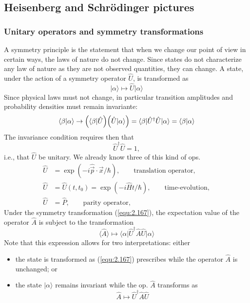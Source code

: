 \subsection{Heisenberg and Schrödinger pictures}
\subsubsection{Unitary operators and symmetry
transformations}
A symmetry principle is the statement that when we change
our point of view in certain ways, the laws of nature do not
change. Since states do not characterize any law of nature
as they are not observed quantities, they can change.
A state, under the action of a symmetry operator $\hat{U}$,
is transformed as
\begin{equation}
  \vert \alpha \rangle \mapsto \hat{U}\vert \alpha \rangle
  \label{equ:2.167}
\end{equation}
Since physical laws must not change, in particular
transition amplitudes and probability densities must remain
invariante:
\begin{equation}
  \langle \beta \vert \alpha \rangle \to  \Bigl(\langle
  \beta\vert \hat{U}\Bigr)
  \Bigl(
  \hat{U}\vert \alpha \rangle
  \Bigr)
  = \langle \beta \vert \hat{U}^{\dagger} \hat{U} \vert
  \alpha \rangle = \langle \beta \vert \alpha \rangle
  \label{equ:2.168}
\end{equation}
The invariance condition requires then that
\begin{equation}
  \hat{U}^{\dagger}\hat{U} = 1,
  \label{equ:2.169}
\end{equation}
i.e., that $\hat{U}$ be unitary. We already know three of
this kind of ops.
\begin{subequations}
  \begin{alignat}{2}
    \hat{U} &= \exp(-i\hat{\vec{p}}\cdot \vec{x}/\hbar),
    \qquad \text{translation operator,} \label{equ:2.170a}\\
    \hat{U} &= \hat{U}(t,t_0) = \exp(-i \hat{H}t /\hbar),
    \qquad \text{time-evolution},\label{equ:2.170b}\\
    \hat{U} &= \hat{P}, \qquad \text{parity operator},
    \label{equ:2.170c}
  \end{alignat}
\end{subequations}
Under the symmetry transformation (\ref{equ:2.167}), the
expectation value of the operator $\hat{A}$ is subject to
the transformation
\begin{equation}
  \langle \hat{A} \rangle \mapsto \langle \alpha \vert
  \hat{U}^{\dagger} \hat{A} \hat{U} \vert \alpha \rangle
  \label{equ:2.171}
\end{equation}
Note that this expression allows for two interpretations:
either
\begin{itemize}
  \item the state is transformed as (\ref{equ:2.167})
    prescribes while the operator $\hat{A}$ is unchanged; or
  \item the state $\vert \alpha \rangle$ remains invariant
    while the op. $\hat{A}$ transforms as
    \begin{equation}
      \hat{A} \mapsto \hat{U}^{\dagger}\hat{A}\hat{U}
      \label{equ:2.172}
    \end{equation}
\end{itemize}
